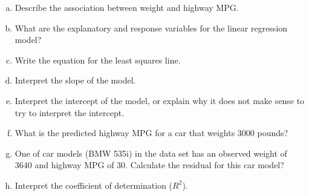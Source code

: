 \documentclass[12pt, fleqn]{article}\usepackage[]{graphicx}\usepackage[]{color}
\begin{document}
\begin{enumerate}[(a)]
\item Describe the association between weight and highway MPG.\\
\vspace{0.5cm}

\item What are the explanatory and response variables for the linear regression model?\\
\vspace{1cm}

\item Write the equation for the least squares line.\\
\vspace{1cm}

\item Interpret the slope of the model.\\
\vspace{1.75cm}

\item Interpret the intercept of the model, or explain why it does not make sense to try to interpret the intercept.\\
\vspace{1.75cm}

\item What is the predicted highway MPG for a car that weights 3000 pounds?\\
\vspace{1cm}

\item One of car models (BMW 535i) in the data set has an observed weight of 3640 and highway MPG of 30.  Calculate the residual for this car model?\\
\vspace{1.75cm}

\item Interpret the coefficient of determination ($R^2$).\\
\end{enumerate}
\end{document}
